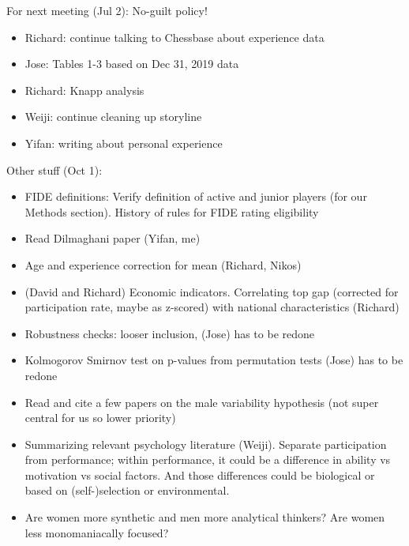 For next meeting  (Jul 2):
No-guilt policy!
\begin{itemize}
\item Richard: continue talking to Chessbase about experience data
\item Jose: Tables 1-3 based on Dec 31, 2019 data
\item Richard: Knapp analysis
\item Weiji: continue cleaning up storyline
\item Yifan: writing about personal experience 
\end{itemize}
Other stuff (Oct 1):
\begin{itemize}
    \item FIDE definitions: Verify definition of active and junior players (for our Methods section). History of rules for FIDE rating eligibility
    \item Read Dilmaghani paper (Yifan, me)
\item Age and experience correction for mean (Richard, Nikos)
\item (David and Richard) Economic indicators. Correlating top gap (corrected for participation rate, maybe as z-scored) with national characteristics (Richard)
    \item Robustness checks: looser inclusion,  (Jose) has to be redone
    \item Kolmogorov Smirnov test on p-values from permutation tests (Jose) has to be redone
    \item Read and cite a few papers on the male variability hypothesis (not super central for us so lower priority)
    \item Summarizing relevant psychology literature (Weiji). Separate participation from performance; within performance, it could be a difference in ability vs motivation vs social factors. And those differences could be biological or based on (self-)selection or environmental.
    \item Are women more synthetic and men more analytical thinkers? Are women less monomaniacally focused?
\end{itemize}









